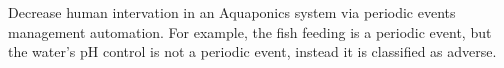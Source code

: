 Decrease human intervation in an Aquaponics system via periodic events management automation.
For example, the fish feeding is a periodic event,
but the water's pH control is not a periodic event,
instead it is classified as adverse.
